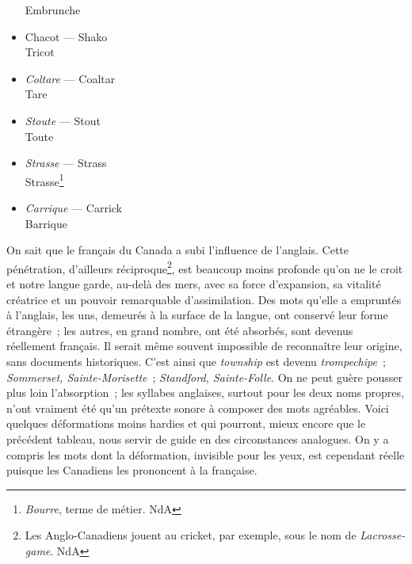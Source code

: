 \documentclass[french,twoside]{book} %
\begin{document}
\begin{itemize}[itemsep=0pt,]
Embrunche
\item Chacot — Shako \\
Tricot
\item {\itshape Coltare} — Coaltar \\
Tare
\item {\itshape Stoute} — Stout \\
Toute
\item {\itshape Strasse} — Strass \\
Strasse\footnote{ {\itshape Bourre}, terme de métier. NdA}
\item {\itshape Carrique} — Carrick \\
Barrique
\end{itemize}

\noindent On sait que le français du Canada a subi l’influence de l’anglais. Cette pénétration, d’ailleurs réciproque\footnote{Les Anglo-Canadiens jouent au cricket, par exemple, sous le nom de {\itshape Lacrosse-game}. NdA}, est beaucoup moins profonde qu’on ne le croit et notre langue garde, au-delà des mers, avec sa force d’expansion, sa vitalité créatrice et un pouvoir remarquable d’assimilation. Des mots qu’elle a empruntés à l’anglais, les uns, demeurés à la surface de la langue, ont conservé leur forme étrangère ; les autres, en grand nombre, ont été absorbés, sont devenus réellement français. Il serait même souvent impossible de reconnaître leur origine, sans documents historiques. C’est ainsi que {\itshape township} est devenu {\itshape trompechipe} ; {\itshape Sommerset, Sainte-Morisette} ; {\itshape Standford, Sainte-Folle}. On ne peut guère pousser plus loin l’absorption ; les syllabes anglaises, surtout pour les deux noms propres, n’ont vraiment été qu’un prétexte sonore à composer des mots agréables. Voici quelques déformations moins hardies et qui pourront, mieux encore que le précédent tableau, nous servir de guide en des circonstances analogues. On y a compris les mots dont la déformation, invisible pour les yeux, est cependant réelle puisque les Canadiens les prononcent à la française.\par
\end{document}
